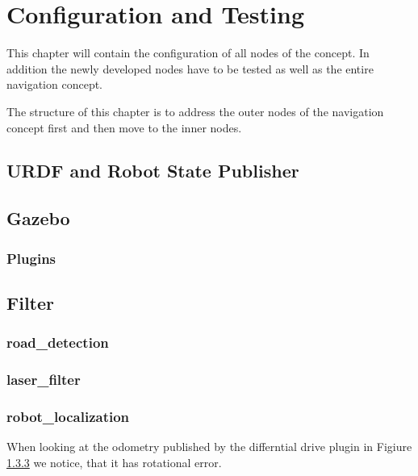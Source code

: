 \chapter{Configuration and Testing}
\label{configurationandtesting}
This chapter will contain the configuration of all nodes of the concept. In addition the newly developed nodes have to be tested as well as the entire navigation concept.


The structure of this chapter is to address the outer nodes of the navigation concept first and then move to the inner nodes.\\


\section{URDF and Robot State Publisher}

\section{Gazebo}

\subsection{Plugins}

\section{Filter}

\subsection{road\_detection}

\subsection{laser\_filter}

\subsection{robot\_localization}

When looking at the odometry published by the differntial drive plugin in Figiure \ref{} we notice, that it has rotational error.\\

